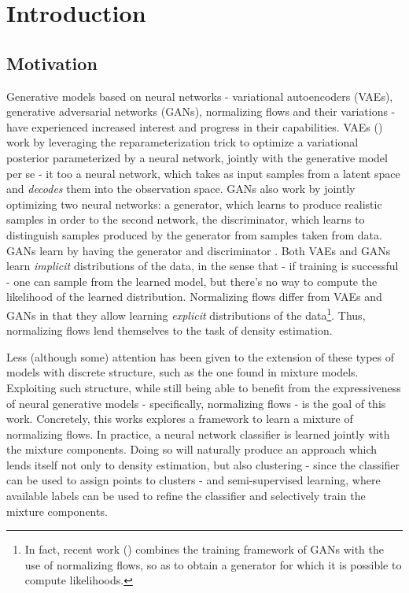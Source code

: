 \chapter{Introduction}
\label{chapter:introduction}

\section{Motivation}
\label{section:motivation}

Generative models based on neural networks - variational autoencoders (VAEs),
generative adversarial networks (GANs), normalizing flows and their variations -
have experienced increased interest and progress in their capabilities. VAEs
(\autocite{vaepaper}) work by leveraging the reparameterization trick to optimize
a variational posterior parameterized by a neural network, jointly with the generative
model per se - it too a neural network, which takes as input samples from a latent
space and \emph{decodes} them into the observation space. GANs also work by
jointly optimizing two neural networks: a generator, which learns to produce
realistic samples in order to  the second network, the discriminator, which
learns to distinguish samples produced by the generator from samples taken from data. GANs learn
by having the generator and discriminator . Both VAEs and GANs learn
\emph{implicit} distributions of the data, in the sense that - if training is
successful - one can sample from the learned model, but there's no way to compute
the likelihood of the learned distribution. Normalizing flows differ from VAEs
and GANs in that they allow learning \emph{explicit} distributions of the
data\footnote{In fact, recent work (\autocite{flowgan}) combines the training
framework of GANs with the use of normalizing flows, so as to obtain a generator
for which it is possible to compute likelihoods.}. Thus, normalizing flows lend
themselves to the task of density estimation.

Less (although some) attention has been given to the extension of these types
of models with discrete structure, such as the one found in mixture models.
Exploiting such structure, while still being able to benefit from the expressiveness
of neural generative models - specifically, normalizing flows - is the goal of this
work. Concretely, this works explores a framework to learn a mixture of normalizing
flows. In practice, a neural network classifier is learned jointly with the mixture
components. Doing so will naturally produce an approach which lends itself not
only to density estimation, but also clustering - since the classifier can be used
to assign points to clusters - and semi-supervised learning, where available
labels can be used to refine the classifier and selectively train the mixture
components.

